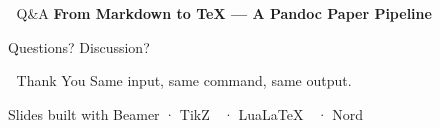 \documentclass[
  10pt,
  ignorenonframetext,
  serif,
  aspectratio=169]{beamer}
\begin{document}
\begin{frame}{🙋 Q\&A}
\protect{}\label{qa}
\textbf{From Markdown to TeX --- A Pandoc Paper Pipeline}

Questions? Discussion? 💬
\end{frame}

\begin{frame}{👏 Thank You}
\protect{}\label{thank-you}
Same input, same command, same output. 🎯

Slides built with Beamer · TikZ 🧩 · LuaLaTeX 📐 · Nord 🌙
\end{frame}
\end{document}
